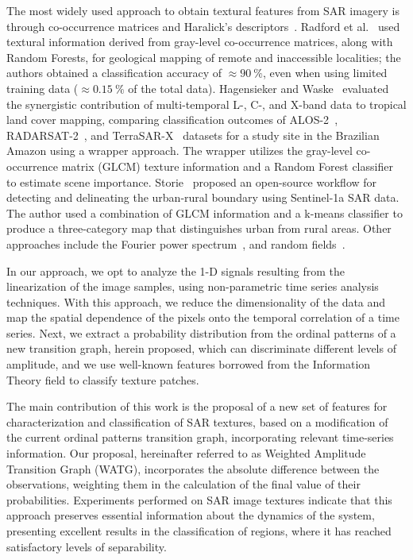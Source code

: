 \documentclass[journal]{IEEEtran}
\begin{document}
The most widely used approach to obtain textural features from SAR imagery is through co-occurrence matrices and Haralick's descriptors~\cite{yu2019detection}.
Radford et al.~\cite{radford2018geological} used textural information derived from gray-level co-occurrence matrices, along with Random Forests, for geological mapping of remote and inaccessible localities; the authors obtained a classification accuracy of $\approx\SI{90}{\percent}$, even when using limited training data ($\approx\SI{0.15}{\percent}$ of the total data). 
%
Hagensieker and Waske~\cite{hagensieker2018evaluation} evaluated the synergistic contribution of multi-temporal L-, C-, and X-band data to tropical land cover mapping, comparing classification outcomes of ALOS-2~\cite{kankaku2013alos}, RADARSAT-2~\cite{morena2004introduction}, and TerraSAR-X~\cite{breit2009terrasar} 
datasets for a study site in the Brazilian Amazon using a wrapper approach. 
The wrapper utilizes the gray-level co-occurrence matrix (GLCM)
texture information and a  Random Forest classifier to estimate scene importance. 
%
Storie~\cite{storie2018urban} proposed an open-source workflow for detecting and delineating the urban-rural boundary using Sentinel-1a SAR data.
The author used a combination of GLCM information and a k-means classifier to produce a three-category map that distinguishes urban from rural areas. 
Other approaches include the Fourier power  spectrum~\cite{Florindo2012Fractal}, and random fields~\cite{zhu2016antarctic}.

In our approach, we opt to analyze the 1-D signals resulting from the linearization of the image samples, using non-parametric time series analysis techniques.
With this approach, we reduce the dimensionality of the data and map the spatial dependence of the pixels onto the temporal correlation of a time series.
Next, we extract a probability distribution from the ordinal patterns of a new transition graph, herein proposed, which can discriminate different levels of amplitude, and we use well-known features borrowed from the Information Theory field to classify texture patches.

The main contribution of this work is the proposal of a new set of features for characterization and classification of SAR textures, based on a modification of the current ordinal patterns transition graph, incorporating relevant time-series information.
Our proposal, hereinafter referred to as Weighted Amplitude Transition Graph (WATG), incorporates the absolute difference between the observations, weighting them in the calculation of the final value of their probabilities.
Experiments performed on SAR image textures indicate that this approach preserves essential information about the dynamics of the system, presenting excellent results in the classification of regions, where it has reached satisfactory levels of separability.
\end{document}
